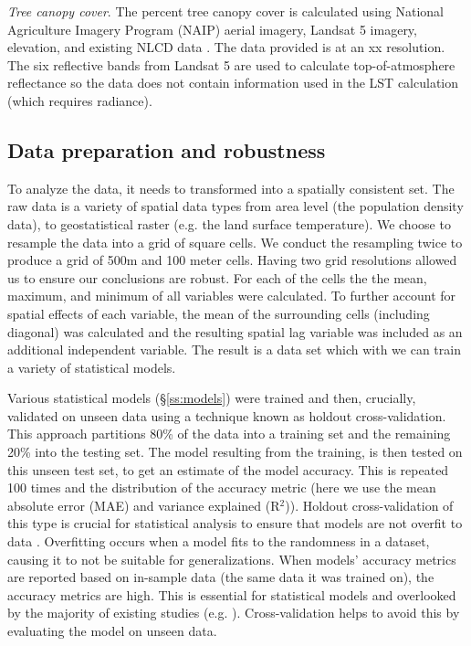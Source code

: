 \documentclass[final,3p,times,twocolumn,sort&compress]{elsarticle}
\begin{document}
\textit{Tree canopy cover}. The percent tree canopy cover is calculated using National Agriculture Imagery Program (NAIP) aerial imagery, Landsat 5 imagery, elevation, and existing NLCD data \cite{Coulston2012-uu, Homer2015-ce}. The data provided is at an xx resolution. The six reflective bands from Landsat 5 are used to calculate top-of-atmosphere reflectance \cite{Coulston2012-uu} so the data does not contain information used in the LST calculation (which requires radiance). 

\subsection{Data preparation and robustness}

To analyze the data, it needs to transformed into a spatially consistent set.
The raw data is a variety of spatial data types from area level (the population density data), to geostatistical raster (e.g. the land surface temperature).
We choose to resample the data into a grid of square cells.
We conduct the resampling twice to produce a grid of 500m and 100 meter cells. 
Having two grid resolutions allowed us to ensure our conclusions are robust.
For each of the cells the the mean, maximum, and minimum of all variables were calculated. 
To further account for spatial effects of each variable, the mean of the surrounding cells (including diagonal) was calculated and the resulting spatial lag variable was included as an additional independent variable. 
The result is a data set which with we can train a variety of statistical models.

Various statistical models (\S \ref{ss:models}) were trained and then, crucially, validated on unseen data using a technique known as holdout cross-validation. 
This approach partitions 80\% of the data into a training set and the remaining 20\% into the testing set.
The model resulting from the training, is then tested on this unseen test set, to get an estimate of the model accuracy.
This is repeated 100 times and the distribution of the accuracy metric (here we use the mean absolute error (MAE) and variance explained (R$^2$)).
Holdout cross-validation of this type is crucial for statistical analysis to ensure that models are not overfit to data \cite{Geron2017-ek}.
Overfitting occurs when a model fits to the randomness in a dataset, causing it to not be suitable for generalizations. 
When models' accuracy metrics are reported based on in-sample data (the same data it was trained on), the accuracy metrics are high.
This is essential for statistical models and overlooked by the majority of existing studies (e.g. \cite{Zhou2014-wc, Peng2018-cp, Chun2017-mm, Chun2018-so,Wang2019-tree}).
Cross-validation helps to avoid this by evaluating the model on unseen data.
\end{document}
